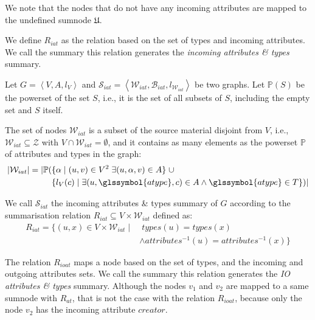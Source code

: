 \begin{remark}
We note that the nodes that do not have any incoming attributes are mapped to the undefined sumnode $\mathfrak{U}$.
\end{remark}

\vspace{.5cm}


We define $R_{iat}$ as the relation based on the set of types and incoming attributes. We call the summary this relation generates the \emph{incoming attributes \& types} summary.

\begin{definition}
	Let $G=\left\langle V, A, l_V \right\rangle$ and $\mathcal{S}_{iat} = \left\langle \mathcal{W}_{iat}, \mathcal{B}_{iat}, l_{\mathcal{W}_{iat}} \right\rangle$ be two graphs. Let $\mathbb{P}(S)$ be the powerset of the set $S$, i.e., it is the set of all subsets of $S$, including the empty set and $S$ itself.

	The set of nodes $\mathcal{W}_{iat}$ is a subset of the source material disjoint from $V$, i.e., $\mathcal{W}_{iat} \subseteq \mathcal{Z}$ with $V \cap \mathcal{W}_{iat} = \emptyset$, and it contains as many elements as the powerset $\mathbb{P}$ of attributes and types in the graph:
	$$
	\begin{aligned}
	\lvert \mathcal{W}_{iat} \rvert = \lvert \mathbb{P} ( & \{ \alpha \mid (u, v) \in V^2\; \exists (u, \alpha, v) \in A \} \;\cup \\
	& \{ l_V(c) \mid \exists (u, \glssymbol{atype}, c) \in A \wedge \glssymbol{atype} \in T \} ) \rvert
	\end{aligned}
	$$

	We call $\mathcal{S}_{iat}$ the incoming attributes \& types summary of $G$ according to the summarisation relation $R_{iat} \subseteq V \times \mathcal{W}_{iat}$ defined as:
	$$
	\begin{aligned}
	R_{iat} = \{ (u, x) \in V \times \mathcal{W}_{iat} \mid &\; types(u) = types(x) \\
	& \wedge attributes^{-1}(u) = attributes^{-1}(x) \}
	\end{aligned}
	$$
	\label{def:iat}
\end{definition}
\vspace{.5cm}


The relation $R_{ioat}$ maps a node based on the set of types, and the incoming and outgoing attributes sets. We call the summary this relation generates the \emph{IO attributes \& types} summary.
Although the nodes $v_1$ and $v_2$ are mapped to a same sumnode with $R_{at}$, that is not the case with the relation $R_{ioat}$, because only the node $v_2$ has the incoming attribute $creator$.

